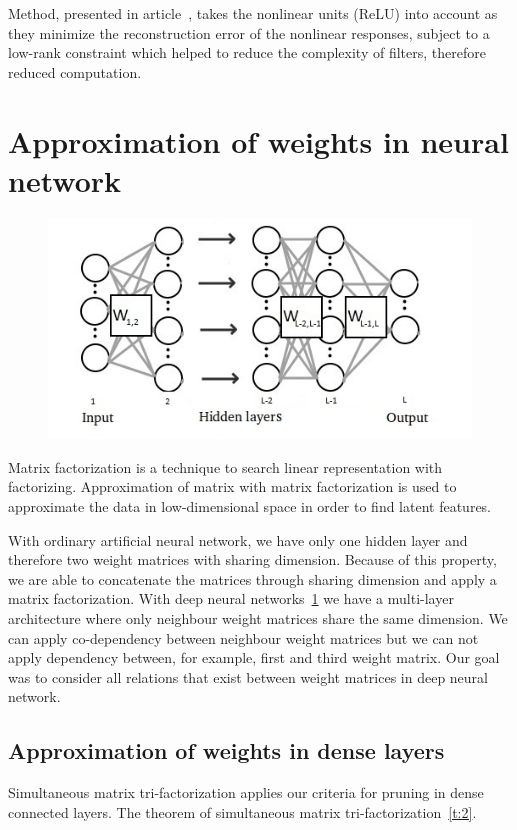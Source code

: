 \documentclass{article} %
\begin{document}
Method, presented in article~\cite{zhang2015efficient}, takes the nonlinear 
units (ReLU) into account as they minimize the reconstruction error of the 
nonlinear responses, subject to a low-rank constraint which helped to reduce the 
complexity of filters, therefore reduced computation. 

\section{Approximation of weights in neural network}
\begin{figure}[!ht]
\centering
\includegraphics[width=.65\linewidth]{globokamreza2.jpg}
\label{f:globokamreza}
\end{figure}


Matrix factorization is a technique to search linear representation with
factorizing. Approximation of matrix with matrix factorization is used to
approximate the data in low-dimensional space in order to find latent features.

With ordinary artificial neural network, we have only one hidden layer and
therefore two weight matrices with sharing dimension. Because of this property,
we are able to concatenate the matrices through sharing dimension and apply a
matrix factorization. With deep neural networks~\ref{f:globokamreza} we have a 
multi-layer architecture where only
neighbour weight matrices share the same dimension. We can apply co-dependency
between neighbour weight matrices but we can not apply dependency between, for
example, first and third weight matrix. Our goal was to consider all relations
that exist between weight matrices in deep neural network. 

\subsection{Approximation of weights in dense layers}
Simultaneous matrix
tri-factorization applies our criteria for pruning in dense connected layers. 
The theorem of simultaneous matrix tri-factorization~\ref{t:2}. 
\end{document}
